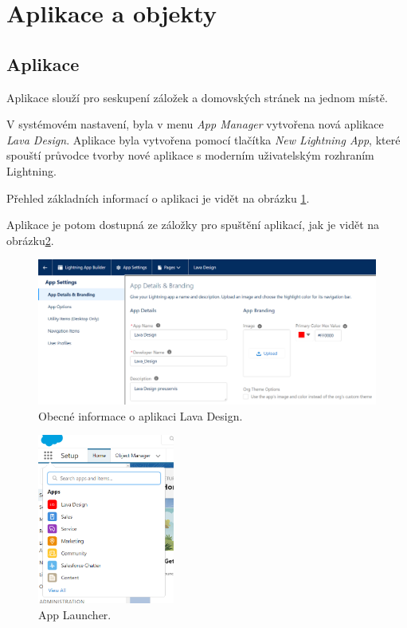 \section{Aplikace a objekty}
\subsection{Aplikace}
Aplikace slouží pro seskupení záložek a domovských stránek na jednom místě.

V systémovém nastavení, byla v menu \emph{App Manager} vytvořena nová aplikace \emph{Lava Design}. Aplikace byla vytvořena pomocí tlačítka \emph{New Lightning App}, které spouští průvodce tvorby nové aplikace s moderním uživatelským rozhraním Lightning.

Přehled základních informací o aplikaci je vidět na obrázku \ref{fig:LD_app_info}.

Aplikace je potom dostupná ze záložky pro spuštění aplikací, jak je vidět na obrázku\ref{fig:app_launcher}.
\begin{figure}[h!]
    \centering
    \includegraphics[width=\textwidth]{assets/7_implementace/aplikace_a_objekty/LD app.png}
    \caption{Obecné informace o aplikaci Lava Design.}
    \label{fig:LD_app_info}
\end{figure}
\begin{figure}[h!]
    \centering
    \includegraphics[width=0.4\textwidth]{assets/7_implementace/aplikace_a_objekty/app launcher.png}
    \caption{App Launcher.}
    \label{fig:app_launcher}
\end{figure}
\FloatBarrier

